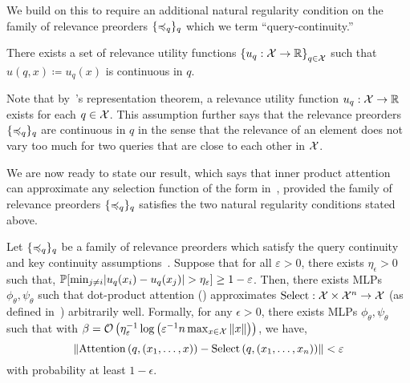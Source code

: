 We build on this to require an additional natural regularity condition on the family of relevance preorders $\{\preccurlyeq_q\}_{q}$ which we term ``query-continuity.''

\begin{assumption}\label{ass:query_cts}
    There exists a set of relevance utility functions $\left\{u_q: {\mathcal{X}} \to \mathbb{R}\right\}_{q \in {\mathcal{X}}}$ such that $u(q, x) \coloneq u_q(x)$ is continuous in $q$.
\end{assumption}

Note that by~'s representation theorem, a relevance utility function $u_q: {\mathcal{X}} \to \mathbb{R}$ exists for each $q \in {\mathcal{X}}$. This assumption further says that the relevance preorders $\{\preccurlyeq_q\}_{q}$ are continuous in $q$ in the sense that the relevance of an element does not vary too much for two queries that are close to each other in ${\mathcal{X}}$.

We are now ready to state our result, which says that inner product attention can approximate any selection function of the form in~, provided the family of relevance preorders $\{\preccurlyeq_q\}_q$ satisfies the two natural regularity conditions stated above.

\begin{theorem}
    Let $\{\preccurlyeq_q\}_q$ be a family of relevance preorders which satisfy the query continuity and key continuity assumptions~. Suppose that for all $\varepsilon > 0$, there exists $\eta_\epsilon > 0$ such that, $\mathbb{P}[\min_{j \neq i} \lvert u_q(x_i) - u_q(x_j)\rvert > \eta_\varepsilon] \geq 1 - \varepsilon$.
    Then, there exists MLPs $\phi_\theta, \psi_\theta$ such that dot-product attention () approximates $\mathrm{Select}: {\mathcal{X}} \times {\mathcal{X}}^n \to {\mathcal{X}}$ (as defined in~) arbitrarily well. Formally, for any $\epsilon > 0$, there exists MLPs $\phi_\theta, \psi_\theta$ such that with $\beta = {\mathcal{O}}\left(\eta_\varepsilon^{-1} \log\left(\varepsilon^{-1} n \max_{x \in {\mathcal{X}}} \left\lVert x\right\rVert\right)\right)$, we have,
    \begin{equation*}
        \norm{\mathrm{Attention}\paren{q, (x_1, \ldots, x)} - \mathrm{Select}\paren{q, (x_1, \ldots, x_n)}} < \epsilon
    \end{equation*}
    with probability at least $1 - \epsilon$.
\end{theorem}

